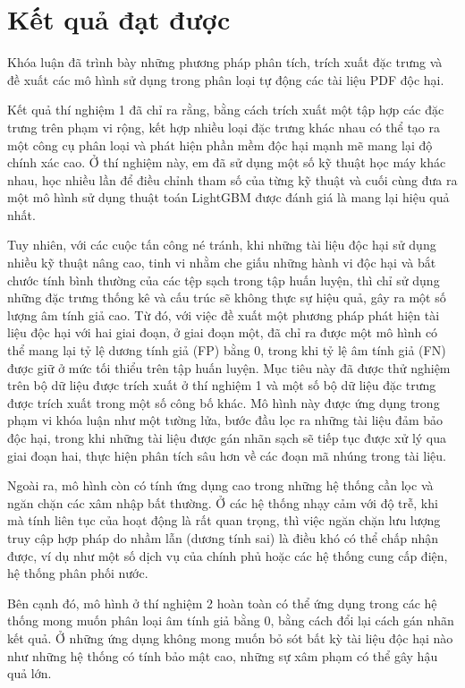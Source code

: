 \documentclass[./../main.tex]{subfiles}
\begin{document}
\section{Kết quả đạt được}
Khóa luận đã trình bày những phương pháp phân tích, trích xuất đặc trưng và đề xuất các mô hình sử dụng trong phân loại tự động các tài liệu PDF độc hại.

Kết quả thí nghiệm 1 đã chỉ ra rằng, bằng cách trích xuất một tập hợp các đặc trưng trên phạm vi rộng, kết hợp nhiều loại đặc trưng khác nhau có thể tạo ra một công cụ phân loại và phát hiện phần mềm độc hại mạnh mẽ mang lại độ chính xác cao. Ở thí nghiệm này, em đã sử dụng một số kỹ thuật học máy khác nhau, học nhiều lần để điều chỉnh tham số của từng kỹ thuật và cuối cùng đưa ra một mô hình sử dụng thuật toán LightGBM được đánh giá là mang lại hiệu quả nhất.

Tuy nhiên, với các cuộc tấn công né tránh, khi những tài liệu độc hại sử dụng nhiều kỹ thuật nâng cao, tinh vi nhằm che giấu những hành vi độc hại và bắt chước tính bình thường của các tệp sạch trong tập huấn luyện, thì chỉ sử dụng những đặc trưng thống kê và cấu trúc sẽ không thực sự hiệu quả, gây ra một số lượng âm tính giả cao. Từ đó, với việc đề xuất một phương pháp phát hiện tài liệu độc hại với hai giai đoạn, ở giai đoạn một, đã chỉ ra được một mô hình có thể mang lại tỷ lệ dương tính giả (FP) bằng 0, trong khi tỷ lệ âm tính giả (FN) được giữ ở mức tối thiểu trên tập huấn luyện. Mục tiêu này đã được thử nghiệm trên bộ dữ liệu được trích xuất ở thí nghiệm 1 và một số bộ dữ liệu đặc trưng được trích xuất trong một số công bố khác. Mô hình này được ứng dụng trong phạm vi khóa luận như một tường lửa, bước đầu lọc ra những tài liệu đảm bảo độc hại, trong khi những tài liệu được gán nhãn sạch sẽ tiếp tục được xử lý qua giai đoạn hai, thực hiện phân tích sâu hơn về các đoạn mã nhúng trong tài liệu.

Ngoài ra, mô hình còn có tính ứng dụng cao trong những hệ thống cần lọc và ngăn chặn các xâm nhập bất thường. Ở các hệ thống nhạy cảm với độ trễ, khi mà tính liên tục của hoạt động là rất quan trọng, thì việc ngăn chặn lưu lượng truy cập hợp pháp do nhầm lẫn (dương tính sai) là điều khó có thể chấp nhận được, ví dụ như một số dịch vụ của chính phủ hoặc các hệ thống cung cấp điện, hệ thống phân phối nước.

Bên cạnh đó, mô hình ở thí nghiệm 2 hoàn toàn có thể ứng dụng trong các hệ thống mong muốn phân loại âm tính giả bằng 0, bằng cách đổi lại cách gán nhãn kết quả. Ở những ứng dụng không mong muốn bỏ sót bất kỳ tài liệu độc hại nào như những hệ thống có tính bảo mật cao, những sự xâm phạm có thể gây hậu quả lớn.
\end{document}
